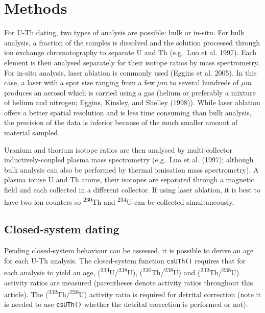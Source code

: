 \documentclass[]{elsarticle} %
\begin{document}
\hypertarget{methods}{%
\section{Methods}\label{methods}}

For U-Th dating, two types of analysis are possible: bulk or in-situ. For bulk analysis, a fraction of the samples is dissolved and the solution processed through ion exchange chromatography to separate U and Th (e.g.~Luo et al. 1997). Each element is then analysed separately for their isotope ratios by mass spectrometry.
For in-situ analysis, laser ablation is commonly used (Eggins et al. 2005). In this case, a laser with a spot size ranging from a few \(\mu m\) to several hundreds of \(\mu m\) produces an aerosol which is carried using a gas (helium or preferably a mixture of helium and nitrogen; Eggins, Kinsley, and Shelley (1998)).
While laser ablation offers a better spatial resolution and is less time consuming than bulk analysis, the precision of the data is inferior because of the much smaller amount of material sampled.

Uranium and thorium isotope ratios are then analysed by multi-collector inductively-coupled plasma mass spectrometry (e.g.~Luo et al. (1997); although bulk analysis can also be performed by thermal ionisation mass spectrometry). A plasma ionise U and Th atoms, their isotopes are separated through a magnetic field and each collected in a different collector. If using laser ablation, it is best to have two ion counters so \textsuperscript{230}Th and \textsuperscript{234}U can be collected simultaneously.

\hypertarget{closed-system-dating}{%
\subsection{Closed-system dating}\label{closed-system-dating}}

Pending closed-system behaviour can be assessed, it is possible to derive an age for each U-Th analysis.
The closed-system function \texttt{csUTh()} requires that for each analysis to yield an age, (\textsuperscript{234}U/\textsuperscript{238}U), (\textsuperscript{230}Th/\textsuperscript{238}U) and (\textsuperscript{232}Th/\textsuperscript{238}U) activity ratios are measured (parentheses denote activity ratios throughout this article). The (\textsuperscript{232}Th/\textsuperscript{238}U) activity ratio is required for detrital correction (note it is needed to use \texttt{csUTh()} whether the detrital correction is performed or not).
\end{document}
